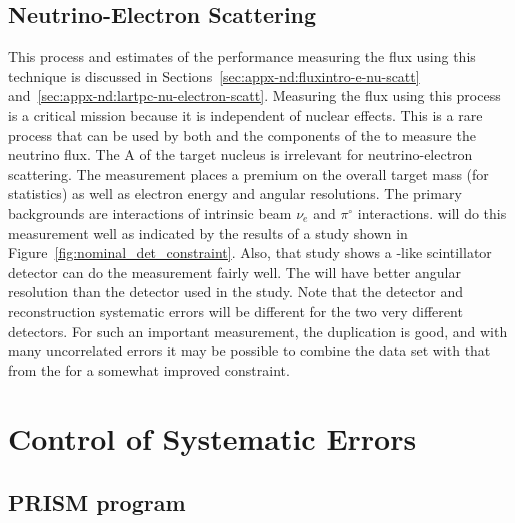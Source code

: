 \subsection{Neutrino-Electron Scattering}
This process and estimates of the   performance measuring the flux using this technique is discussed in Sections~\ref{sec:appx-nd:fluxintro-e-nu-scatt} and~\ref{sec:appx-nd:lartpc-nu-electron-scatt}.  Measuring the flux using this process is a critical  mission because it is independent of nuclear effects.  This is a rare process that can be used by both  and the  components of the  to measure the neutrino flux.  The A of the target nucleus is irrelevant for neutrino-electron scattering.  The measurement places a premium on the overall target mass (for statistics) as well as electron energy and angular resolutions.  The primary backgrounds are  interactions of intrinsic beam $\nu_{e}$ and $\pi^{\circ}$ interactions.   will do this measurement well as indicated by the results of a study shown in Figure~\ref{fig:nominal_det_constraint}.  Also, that study shows a -like scintillator detector can do the measurement fairly well.  The  will have better angular resolution than the detector used in the study. Note that the detector and reconstruction systematic errors will be different for the two very different detectors.  For such an important measurement, the duplication is good, and with many uncorrelated errors it may be possible to combine the  data set with that from the  for a somewhat improved constraint. 


\section{Control of Systematic Errors}


\subsection{PRISM program}

